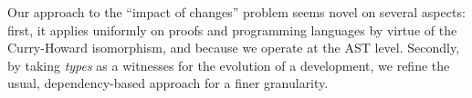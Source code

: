 \documentclass{article}
\newcommand{\remtext}[1]{\textcolor{bwgreen}{$\triangleright$ \textsl{#1}}}
\renewcommand{\remtext}[1]{}
\begin{document}
Our approach to the ``impact of changes'' problem seems novel on
several aspects: first, it applies uniformly on proofs and programming
languages by virtue of the Curry-Howard isomorphism, and because we
operate at the AST level. Secondly, by taking \emph{types} as a
witnesses for the evolution of a development, we refine the usual,
dependency-based approach for a finer granularity.












\end{document}
